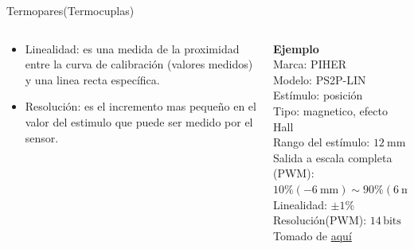 \documentclass[aspectratio=169]{beamer}
\begin{document}
\begin{frame}{Termopares(Termocuplas)}
    \begin{columns}[c, onlytextwidth]
        \begin{column}{0.55\textwidth}
            \begin{itemize}
                \item Linealidad: es una medida de la proximidad entre la curva de calibración (valores medidos) y una linea recta específica.
                \item Resolución: es el incremento mas pequeño en el valor del estimulo que puede ser medido por el sensor. 
            \end{itemize}
        \end{column}
        \begin{column}{0.40\textwidth}
            \textbf{Ejemplo}\\[4pt]
            Marca: PIHER\\[4pt]
            Modelo: PS2P-LIN\\[4pt]
            Estímulo: posición\\[4pt]
            Tipo: magnetico, efecto Hall\\[4pt]
            Rango del estímulo: $\SI{12}{\milli\meter}$\\[4pt]
            Salida a escala completa (PWM): $10\% (\SI{-6}{\milli\meter}) \sim 90\% (\SI{6}{\milli\meter})$\\[4pt]
            Linealidad: $\pm 1 \%$ \\[4pt]
            Resolución(PWM): $14\,\mathrm{bits}$\\[10pt]
            \tiny{Tomado de \href{https://www.piher.net/pdf/PS2P-LINIntroduction.pdf}{aquí}}
        \end{column}
    \end{columns}
\end{frame}
\end{document}
